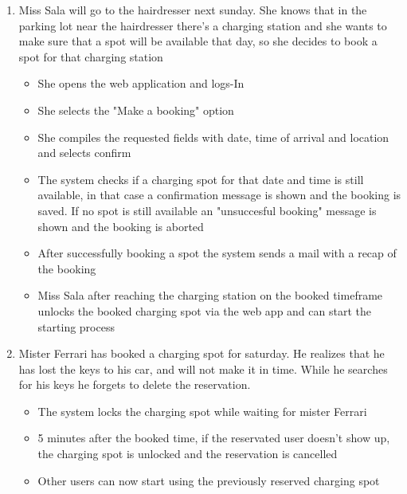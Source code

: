 \documentclass[table, 12pt]{article} %
\begin{document}
\begin{enumerate}
\begin{itemize}
            \end{itemize}
            
            \item Miss Sala will go to the hairdresser next sunday. She knows that in the parking lot near the hairdresser there's a charging station and she wants to make sure that a spot will be available that day, so she decides to book a spot for that charging station
            \begin{itemize}
                \item She opens the web application and logs-In
                \item She selects the "Make a booking" option
                \item She compiles the requested fields with date, time of arrival and location and selects confirm
                \item The system checks if a charging spot for that date and time is still available, in that case a confirmation message is shown and the booking is saved. If no spot is still available an "unsuccesful booking" message is shown and the booking is aborted
                \item After successfully booking a spot the system sends a mail with a recap of the booking 
                \item Miss Sala after reaching the charging station on the booked timeframe unlocks the booked charging spot via the web app and can start the starting process
            \end{itemize}
            
            \item Mister Ferrari has booked a charging spot for saturday. He realizes that he has lost the keys to his car, and will not make it in time. While he searches for his keys he forgets to delete the reservation.
            \begin{itemize}
                \item The system locks the charging spot while waiting for mister Ferrari
                \item 5 minutes after the booked time, if the reservated user doesn't show up, the charging spot is unlocked and the reservation is cancelled
                \item Other users can now start using the previously reserved charging spot
            \end{itemize}


\end{enumerate}
\end{document}
